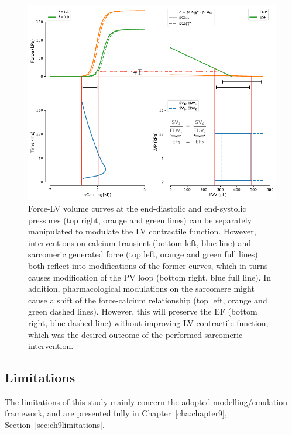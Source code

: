 \begin{figure}[ht!]
    \myfloatalign
    \includegraphics[width=\textwidth]{figures/chapter08/Fig7.pdf}
    \caption{Force-LV volume curves at the end-diastolic and end-systolic pressures (top right, orange and green lines) can be separately manipulated to modulate the LV contractile function. However, interventions on calcium transient (bottom left, blue line) and sarcomeric generated force (top left, orange and green full lines) both reflect into modifications of the former curves, which in turns causes modification of the PV loop (bottom right, blue full line). In addition, pharmacological modulations on the sarcomere might cause a shift of the force-calcium relationship (top left, orange and green dashed lines). However, this will preserve the EF (bottom right, blue dashed line) without improving LV contractile function, which was the desired outcome of the performed sarcomeric intervention.}
    \label{fig:schematic}
\end{figure}


%
%
%
\subsection{Limitations}\label{sec:ch8limitations}
The limitations of this study mainly concern the adopted modelling/emulation framework, and are presented fully in Chapter~\ref{cha:chapter9}, Section~\ref{sec:ch9limitations}.

%
%
%
